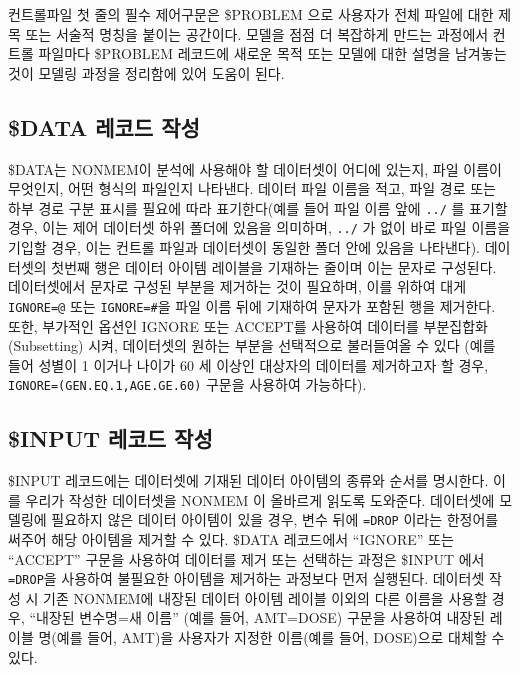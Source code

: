 \documentclass[
  10pt,
  krantz2,
  a4paper]{krantz}
\theoremstyle{definition}
\theoremstyle{definition}
\theoremstyle{definition}
\theoremstyle{remark}
\begin{document}
컨트롤파일 첫 줄의 필수 제어구문은 \$PROBLEM 으로 사용자가 전체 파일에 대한 제목 또는 서술적 명칭을 붙이는 공간이다. 모델을 점점 더 복잡하게 만드는 과정에서 컨트롤 파일마다 \$PROBLEM 레코드에 새로운 목적 또는 모델에 대한 설명을 남겨놓는 것이 모델링 과정을 정리함에 있어 도움이 된다.

\hypertarget{data-uxb808uxcf54uxb4dc-uxc791uxc131}{%
\subsection{\$DATA 레코드 작성}\label{data-uxb808uxcf54uxb4dc-uxc791uxc131}}

\$DATA는 NONMEM이 분석에 사용해야 할 데이터셋이 어디에 있는지, 파일 이름이 무엇인지, 어떤 형식의 파일인지 나타낸다. 데이터 파일 이름을 적고, 파일 경로 또는 하부 경로 구분 표시를 필요에 따라 표기한다(예를 들어 파일 이름 앞에 \texttt{../} 를 표기할 경우, 이는 제어 데이터셋 하위 폴더에 있음을 의미하며, \texttt{../} 가 없이 바로 파일 이름을 기입할 경우, 이는 컨트롤 파일과 데이터셋이 동일한 폴더 안에 있음을 나타낸다). 데이터셋의 첫번째 행은 데이터 아이템 레이블을 기재하는 줄이며 이는 문자로 구성된다. 데이터셋에서 문자로 구성된 부분을 제거하는 것이 필요하며, 이를 위하여 대게 \texttt{IGNORE=@} 또는 \texttt{IGNORE=\#}을 파일 이름 뒤에 기재하여 문자가 포함된 행을 제거한다. 또한, 부가적인 옵션인 IGNORE 또는 ACCEPT를 사용하여 데이터를 부분집합화(Subsetting) 시켜, 데이터셋의 원하는 부분을 선택적으로 불러들여올 수 있다 (예를 들어 성별이 1 이거나 나이가 60 세 이상인 대상자의 데이터를 제거하고자 할 경우, \texttt{IGNORE=(GEN.EQ.1,AGE.GE.60)} 구문을 사용하여 가능하다).

\hypertarget{input-uxb808uxcf54uxb4dc-uxc791uxc131}{%
\subsection{\$INPUT 레코드 작성}\label{input-uxb808uxcf54uxb4dc-uxc791uxc131}}

\$INPUT 레코드에는 데이터셋에 기재된 데이터 아이템의 종류와 순서를 명시한다. 이를 우리가 작성한 데이터셋을 NONMEM 이 올바르게 읽도록 도와준다. 데이터셋에 모델링에 필요하지 않은 데이터 아이템이 있을 경우, 변수 뒤에 \texttt{=DROP} 이라는 한정어를 써주어 해당 아이템을 제거할 수 있다. \$DATA 레코드에서 ``IGNORE'' 또는 ``ACCEPT'' 구문을 사용하여 데이터를 제거 또는 선택하는 과정은 \$INPUT 에서 \texttt{=DROP}을 사용하여 불필요한 아이템을 제거하는 과정보다 먼저 실행된다. 데이터셋 작성 시 기존 NONMEM에 내장된 데이터 아이템 레이블 이외의 다른 이름을 사용할 경우, ``내장된 변수명=새 이름'' (예를 들어, AMT=DOSE) 구문을 사용하여 내장된 레이블 명(예를 들어, AMT)을 사용자가 지정한 이름(예를 들어, DOSE)으로 대체할 수 있다.
\end{document}
